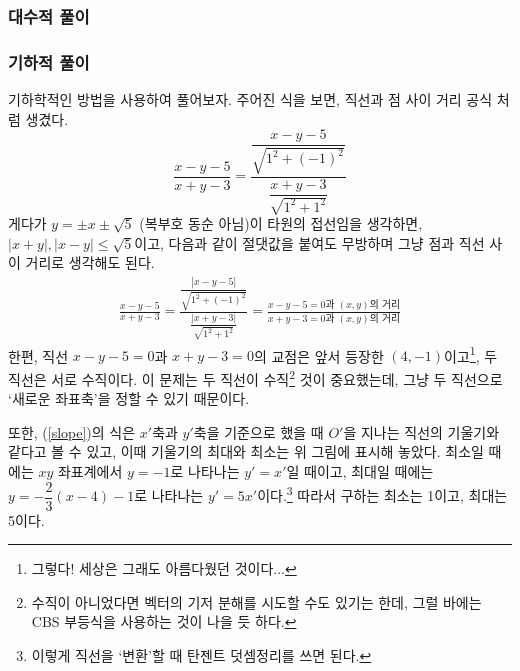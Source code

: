 \documentclass{scrartcl}
\begin{document}
\subsubsection{대수적 풀이}


\subsubsection{기하적 풀이}
기하학적인 방법을 사용하여 풀어보자. 주어진 식을 보면, 직선과 점 사이 거리 공식 처럼 생겼다.
\[\frac{x-y-5}{x+y-3}=\frac{\dfrac{x-y-5}{\sqrt{1^2+(-1)^2}}}{\dfrac{x+y-3}{\sqrt{1^2+1^2}}}\]
게다가 \(y=\pm x\pm\sqrt{5}\) (복부호 동순 아님)이 타원의 접선임을 생각하면, \(|x+y|,|x-y|\leq\sqrt{5}\)이고, 다음과 같이 절댓값을 붙여도 무방하며 그냥 점과 직선 사이 거리로 생각해도 된다.
\begin{align}\label{slope}\frac{x-y-5}{x+y-3}=\frac{\dfrac{|x-y-5|}{\sqrt{1^2+(-1)^2}}}{\dfrac{|x+y-3|}{\sqrt{1^2+1^2}}}=\frac{\text{\(x-y-5=0\)과 \((x,y)\)의 거리}}{\text{\(x+y-3=0\)과 \((x,y)\)의 거리}}\end{align}
한편, 직선 \(x-y-5=0\)과 \(x+y-3=0\)의 교점은 앞서 등장한 \((4,-1)\)이고\footnote{그렇다! 세상은 그래도 아름다웠던 것이다...}, 두 직선은 서로 수직이다. 이 문제는 두 직선이 수직\footnote{수직이 아니었다면 벡터의 기저 분해를 시도할 수도 있기는 한데, 그럴 바에는 CBS 부등식을 사용하는 것이 나을 듯 하다.} 것이 중요했는데, 그냥 두 직선으로 `새로운 좌표축'을 정할 수 있기 때문이다.
\begin{figure}[H]
\centering

\end{figure}
또한, (\ref{slope})의 식은 \(x'\)축과 \(y'\)축을 기준으로 했을 때 \(O'\)을 지나는 직선의 기울기와 같다고 볼 수 있고, 이때 기울기의 최대와 최소는 위 그림에 표시해 놓았다. 최소일 때에는 \(xy\) 좌표계에서 \(y=-1\)로 나타나는 \(y'=x'\)일 때이고, 최대일 때에는 \(y=-\dfrac{2}{3}(x-4)-1\)로 나타나는 \(y'=5x'\)이다.\footnote{이렇게 직선을 `변환'할 때 탄젠트 덧셈정리를 쓰면 된다.} 따라서 구하는 최소는 1이고, 최대는 5이다.
\end{document}
